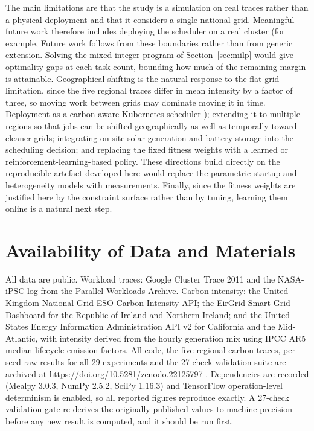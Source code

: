 \documentclass[12pt,a4paper]{article}
\providecommand{\DIFaddtex}[1]{{\protect\color{blue} \sf #1}} %
\providecommand{\DIFdeltex}[1]{{\protect\color{red} \scriptsize #1}} %
\providecommand{\DIFaddbegin}{} %
\providecommand{\DIFaddend}{} %
\providecommand{\DIFdelbegin}{} %
\providecommand{\DIFdelend}{} %
\providecommand{\DIFadd}[1]{\texorpdfstring{\DIFaddtex{#1}}{#1}} %
\providecommand{\DIFdel}[1]{\texorpdfstring{\DIFdeltex{#1}}{}} %
\providecommand{\DIFscaledelfig}{0.5}
\newlength{\DIFdelgraphicswidth} %
\newlength{\DIFdelgraphicsheight} %
\providecommand{\DIFaddincludegraphics}[2][]{{\color{blue}\fbox{\DIFOincludegraphics[#1]{#2}}}} %
\providecommand{\DIFdelincludegraphics}[2][]{%
\sbox{\DIFdelgraphicsbox}{\DIFOincludegraphics[#1]{#2}}%
\settoboxwidth{\DIFdelgraphicswidth}{\DIFdelgraphicsbox} %
\settoboxtotalheight{\DIFdelgraphicsheight}{\DIFdelgraphicsbox} %
\scalebox{\DIFscaledelfig}{%
\parbox[b]{\DIFdelgraphicswidth}{\usebox{\DIFdelgraphicsbox}\\[-\baselineskip] \rule{\DIFdelgraphicswidth}{0em}}\llap{\resizebox{\DIFdelgraphicswidth}{\DIFdelgraphicsheight}{%
\setlength{\unitlength}{\DIFdelgraphicswidth}%
\begin{picture}(1,1)%
\thicklines\linethickness{2pt} %
{\color[rgb]{1,0,0}\put(0,0){\framebox(1,1){}}}%
{\color[rgb]{1,0,0}\put(0,0){\line( 1,1){1}}}%
{\color[rgb]{1,0,0}\put(0,1){\line(1,-1){1}}}%
\end{picture}%
}\hspace*{3pt}}} %
} %
\DeclareRobustCommand{\DIFaddbegin}{\DIFOaddbegin \let\includegraphics\DIFaddincludegraphics} %
\DeclareRobustCommand{\DIFaddend}{\DIFOaddend \let\includegraphics\DIFOincludegraphics} %
\DeclareRobustCommand{\DIFdelbegin}{\DIFOdelbegin \let\includegraphics\DIFdelincludegraphics} %
\DeclareRobustCommand{\DIFdelend}{\DIFOaddend \let\includegraphics\DIFOincludegraphics} %
\begin{document}
\DIFdelbegin \DIFdel{The main limitations are that the study is a simulation on real traces rather than a physical deployment and
that it considers a single national grid. Meaningful future work therefore includes deploying the scheduler on
a real cluster (for example, }\DIFdelend \DIFaddbegin \DIFadd{Future work follows from these boundaries rather than from generic extension. Solving the mixed-integer
program of Section~\ref{sec:milp} would give optimality gaps at each task count, bounding how much of the
remaining margin is attainable. Geographical shifting is the natural response to the flat-grid limitation,
since the five regional traces differ in mean intensity by a factor of three, so moving work between grids may
dominate moving it in time. Deployment }\DIFaddend as a carbon-aware Kubernetes scheduler \DIFdelbegin \DIFdel{); extending it to multiple regions so that
jobs can be shifted geographically as well as temporally toward cleaner grids; integrating on-site solar
generation and battery storage into the scheduling decision; and replacing the fixed fitness weights with a
learned or reinforcement-learning-based policy. These directions build directly on the reproducible artefact
developed here}\DIFdelend \DIFaddbegin \DIFadd{would replace the parametric
startup and heterogeneity models with measurements. Finally, since the fitness weights are justified here by
the constraint surface rather than by tuning, learning them online is a natural next step.
}

\section*{\DIFadd{Availability of Data and Materials}}
\DIFadd{All data are public. Workload traces: Google Cluster Trace 2011 \cite{reiss2011google} and the NASA-iPSC log
from the Parallel Workloads Archive. Carbon intensity: the United Kingdom National Grid ESO Carbon Intensity
API; the EirGrid Smart Grid Dashboard for the Republic of Ireland and Northern Ireland; and the United States
Energy Information Administration API v2 for California and the Mid-Atlantic, with intensity derived from the
hourly generation mix using IPCC AR5 median lifecycle emission factors. All code, the five regional carbon
traces, per-seed raw results for all 29 experiments and the 27-check validation suite are archived at
}\url{https://doi.org/10.5281/zenodo.22125797}\DIFadd{. Dependencies are recorded (Mealpy 3.0.3, NumPy 2.5.2, SciPy 1.16.3)
and TensorFlow operation-level determinism is enabled, so all reported figures reproduce exactly. A
27-check validation gate re-derives the originally published values to machine precision before any new result
is computed, and it should be run first}\DIFaddend .



\end{document}
